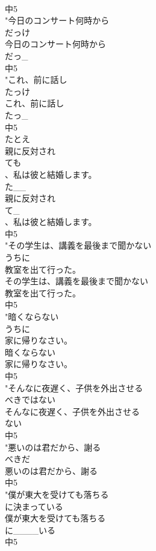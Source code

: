 \documentclass[8pt]{extreport}
\begin{document}
\begin{CJK}{UTF8}{min}
\\	中5
\\	"今日のコンサート何時から
\\	だっけ
\\	今日のコンサート何時から
\\	だっ_
\\	中5
\\	"これ、前に話し
\\	たっけ
\\	これ、前に話し
\\	たっ_
\\	中5
\\	たとえ
\\	親に反対され
\\	ても
\\	、私は彼と結婚します。
\\	た__
\\	親に反対され
\\	て_
\\	、私は彼と結婚します。
\\	中5
\\	"その学生は、講義を最後まで聞かない
\\	うちに
\\	教室を出て行った。
\\	その学生は、講義を最後まで聞かない
\\	教室を出て行った。
\\	中5
\\	"暗くならない
\\	うちに
\\	家に帰りなさい。
\\	暗くならない
\\	家に帰りなさい。
\\	中5
\\	"そんなに夜遅く、子供を外出させる
\\	べきではない
\\	そんなに夜遅く、子供を外出させる
\\	ない
\\	中5
\\	"悪いのは君だから、謝る
\\	べきだ
\\	悪いのは君だから、謝る
\\	中5
\\	"僕が東大を受けても落ちる
\\	に決まっている
\\	僕が東大を受けても落ちる
\\	に____いる
\\	中5

\end{CJK}
\end{document}
